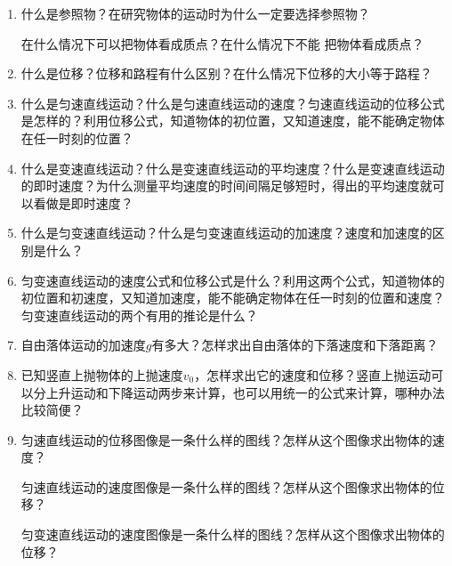 \begin{enumerate}
\item 什么是参照物？在研究物体的运动时为什么一定要选择参照物？

在什么情况下可以把物体看成质点？在什么情况下不能
把物体看成质点？
\item 什么是位移？位移和路程有什么区别？在什么情况下位移的大小等于路程？
\item 什么是匀速直线运动？什么是匀速直线运动的速度？匀速直线运动的位移公式是怎样的？利用位移公式，知道物体的初位置，又知道速度，能不能确定物体在任一时刻的位置？
\item 什么是变速直线运动？什么是变速直线运动的平均速度？什么是变速直线运动的即时速度？为什么测量平均速度的时间间隔足够短时，得出的平均速度就可以看做是即时速度？
\item 什么是匀变速直线运动？什么是匀变速直线运动的加速度？速度和加速度的区别是什么？
\item 匀变速直线运动的速度公式和位移公式是什么？利用这两个公式，知道物体的初位置和初速度，又知道加速度，能不能确定物体在任一时刻的位置和速度？
匀变速直线运动的两个有用的推论是什么？
\item 自由落体运动的加速度$g$有多大？怎样求出自由落体的下落速度和下落距离？
\item 已知竖直上抛物体的上抛速度$v_0$，怎样求出它的速度和位移？竖直上抛运动可以分上升运动和下降运动两步来计算，也可以用统一的公式来计算，哪种办法比较简便？
\item 匀速直线运动的位移图像是一条什么样的图线？怎样从这个图像求出物体的速度？

匀速直线运动的速度图像是一条什么样的图线？怎样从这个图像求出物体的位移？

匀变速直线运动的速度图像是一条什么样的图线？怎样从这个图像求出物体的位移？

\end{enumerate}


